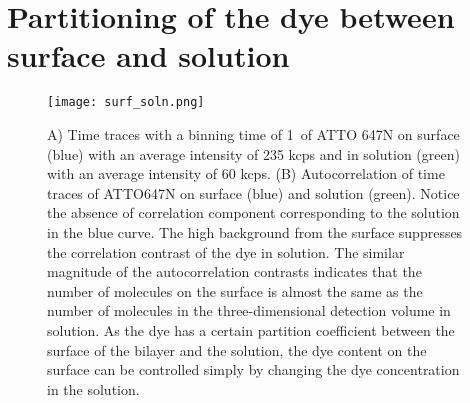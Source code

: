 \section{Partitioning of the dye between surface and solution}
\begin{figure}[ht]
  \centering
  \texttt{[image: surf\_soln.png]}
  \makeatletter
  \renewcommand{\fnum@figure}{\figurename~S\thefigure}
  \makeatother{}
  \caption{A) Time traces with a binning time of 1~\ms of ATTO 647N on surface (blue) with an average intensity of 235 kcps and in solution (green) with an average intensity of 60 kcps. (B) Autocorrelation of time traces of ATTO647N on surface (blue) and solution (green). Notice the absence of correlation component corresponding to the solution in the blue curve. The high background from the surface suppresses the correlation contrast of the dye in solution. The similar magnitude of the autocorrelation contrasts indicates that the number of molecules on the surface is almost the same as the number of molecules in the three-dimensional detection volume in solution. As the dye has a certain partition coefficient between the surface of the bilayer and the solution, the dye content on the surface can be controlled simply by changing the dye concentration in the solution.}
  \label{SIfig:surf-soln}
\end{figure}